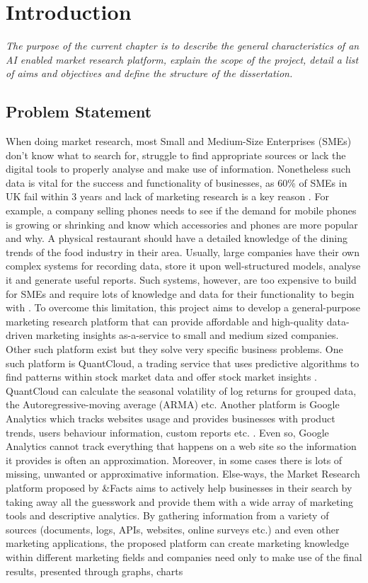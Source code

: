 \newpage
\chapter{Introduction}

\textsl{The purpose of the current chapter is to describe the general characteristics of an AI enabled market research platform, explain the scope of the project, detail a list of aims and objectives and define the structure of the dissertation.}

\section{Problem Statement}
When doing market research, most Small and Medium-Size Enterprises (SMEs) don’t know what to search for, struggle to find appropriate sources or lack the digital tools to properly analyse and make use of information. Nonetheless such data is vital for the success and functionality of businesses, as 60\% of SMEs in UK fail within 3 years and lack of marketing research is a key reason \cite{feasibility}. For example, a company selling phones needs to see if the demand for mobile phones is growing or shrinking and know which accessories and phones are more popular and why. A physical restaurant should have a detailed knowledge of the dining trends of the food industry in their area. Usually, large companies have their own complex systems for recording data, store it upon well-structured models, analyse it and generate useful reports. Such systems, however, are too expensive to build for SMEs and require lots of knowledge and data for their functionality to begin with \cite{digitaltrasformationsmes}. To overcome this limitation, this project aims to develop a general-purpose marketing research platform that can provide affordable and high-quality data-driven marketing insights as-a-service to small and medium sized companies. Other such platform exist but they solve very specific business problems. One such platform is QuantCloud, a trading service that uses predictive algorithms to find patterns within stock market data and offer stock market insights \cite{quantcloud}. QuantCloud can calculate the seasonal volatility of log returns for grouped data, the Autoregressive-moving average (ARMA) etc. Another platform is Google Analytics which tracks websites usage and provides businesses with product trends, users behaviour information, custom reports etc. \cite{googleanalytics}. Even so, Google Analytics cannot track everything that happens on a web site so the information it provides is often an approximation. Moreover, in some cases there is lots of missing, unwanted or approximative information. Else-ways, the Market Research platform proposed by \&Facts aims to actively help businesses in their search by taking away all the guesswork and provide them with a wide array of marketing tools and descriptive analytics. By gathering information from a variety of sources (documents, logs, APIs, websites, online surveys etc.) and even other marketing applications, the proposed platform can create marketing knowledge within different marketing fields and companies need only to make use of the final results, presented through graphs, charts 